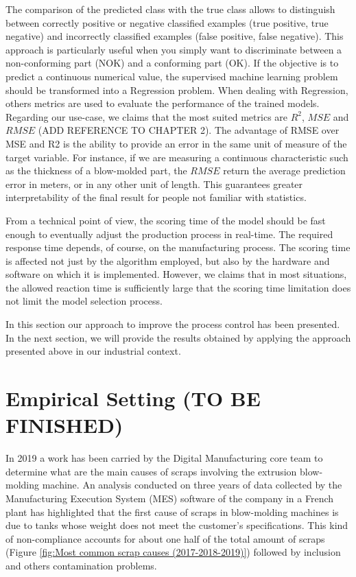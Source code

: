 The comparison of the predicted class with the true class allows to distinguish between correctly positive or negative classified examples (true positive, true negative) and incorrectly classified examples (false positive, false negative). This approach is particularly useful when you simply want to discriminate between a non-conforming part (NOK) and a conforming part (OK). If the objective is to predict a continuous numerical value, the supervised machine learning problem should be transformed into a Regression problem. When dealing with Regression, others metrics are used to evaluate the performance of the trained models. Regarding our use-case, we claims that the most suited metrics are $R^2$, $MSE$ and $RMSE$ (ADD REFERENCE TO CHAPTER 2). The advantage of RMSE over MSE and R2 is the ability to provide an error in the same unit of measure of the target variable. For instance, if we are measuring a continuous characteristic such as the thickness of a blow-molded part, the $RMSE$ return the average prediction error in meters, or in any other unit of length. This guarantees greater interpretability of the final result for people not familiar with statistics.

From a technical point of view, the scoring time of the model should be fast enough to eventually adjust the production process in real-time. The required response time depends, of course, on the manufacturing process. The scoring time is affected not just by the algorithm employed, but also by the hardware and software on which it is implemented. However, we claims that in most situations, the allowed reaction time is sufficiently large that the scoring time limitation does not limit the model selection process.


In this section our approach to improve the process control has been presented. In the next section, we will provide the results obtained by applying the approach presented above in our industrial context.

\section{Empirical Setting (TO BE FINISHED)} \label{Empirical Setting}

In 2019 a work has been carried by the Digital Manufacturing core team to determine what are the main causes of scraps involving the extrusion blow-molding machine. An analysis conducted on three years of data collected by the Manufacturing Execution System (MES) software of the company in a French plant has highlighted that the first cause of scraps in blow-molding machines is due to tanks whose weight does not meet the customer's specifications. This kind of non-compliance accounts for about one half of the total amount of scraps (Figure \ref{fig:Most common scrap causes (2017-2018-2019)}) followed by inclusion and others contamination problems. 

